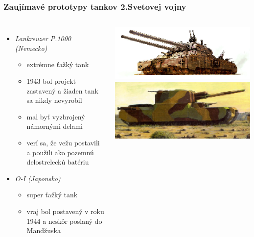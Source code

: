 \documentclass{beamer}
\begin{document}
	\begin{frame}
		\frametitle{Zaujímavé prototypy tankov 2.Svetovej vojny}
		\begin{columns}
			\begin{itemize}
				\item \textit{Lankreuzer P.1000 (Nemecko)}
				\begin{itemize}
					\item extrémne ťažký tank
					\item 1943 bol projekt zastavený a žiaden tank sa nikdy nevyrobil
					\item mal byť vyzbrojený námornými delami
					\item verí sa, že vežu postavili a použili ako pozemnú delostreleckú batériu
				\end{itemize}
				
				\item \textit{O-I (Japonsko)}
				\begin{itemize}
					\item super ťažký tank
					\item vraj bol postavený v roku 1944 a neskôr poslaný do Mandžuska
				\end{itemize}
			\end{itemize}
			
				\includegraphics[scale=0.65]{potkan} \\
				\includegraphics[scale=0.75]{oi}
		\end{columns}
	\end{frame}
	
\end{document}
